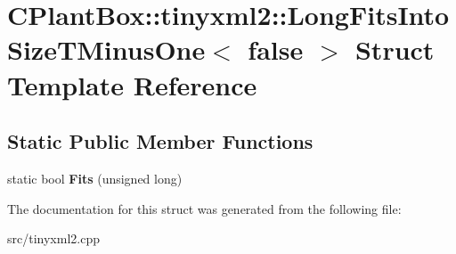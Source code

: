 \hypertarget{structCPlantBox_1_1tinyxml2_1_1LongFitsIntoSizeTMinusOne_3_01false_01_4}{}\section{C\+Plant\+Box\+:\+:tinyxml2\+:\+:Long\+Fits\+Into\+Size\+T\+Minus\+One$<$ false $>$ Struct Template Reference}
\label{structCPlantBox_1_1tinyxml2_1_1LongFitsIntoSizeTMinusOne_3_01false_01_4}
\subsection*{Static Public Member Functions}
\begin{DoxyCompactItemize}
\item 
\mbox{\label{structCPlantBox_1_1tinyxml2_1_1LongFitsIntoSizeTMinusOne_3_01false_01_4_a8d213de91cf20b2bb6a8b2b70d0d6d5d}} 
static bool {\bfseries Fits} (unsigned long)
\end{DoxyCompactItemize}


The documentation for this struct was generated from the following file\+:\begin{DoxyCompactItemize}
\item 
src/tinyxml2.\+cpp\end{DoxyCompactItemize}
